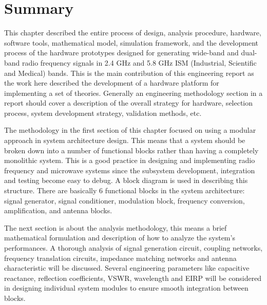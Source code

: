 \documentclass[12pt,a4paper]{report}
\begin{document}
	
	\section{Summary}
	\vspace{0.5\baselineskip}
	
	This chapter described the entire process of design, analysis procedure, hardware, software tools, mathematical model, simulation framework, and the development process of the hardware prototypes designed for generating wide-band and dual-band radio frequency signals in 2.4 GHz and 5.8 GHz ISM (Industrial, Scientific and Medical) bands. This is the main contribution of this engineering report as the work here described the development of a hardware platform for implementing a set of theories. Generally an engineering methodology section in a report should cover a description of the overall strategy for hardware, selection process, system development strategy, validation methods, etc.
	
	\vspace{0.5\baselineskip}
	
	The methodology in the first section of this chapter focused on using a modular approach in system architecture design. This means that a system should be broken down into a number of functional blocks rather than having a completely monolithic system. This is a good practice in designing and implementing radio frequency and microwave systems since the subsystem development, integration and testing become easy to debug. A block diagram is used in describing this structure. There are basically 6 functional blocks in the system architecture: signal generator, signal conditioner, modulation block, frequency conversion, amplification, and antenna blocks.
	
	\vspace{0.5\baselineskip}
	
	The next section is about the analysis methodology, this means a brief mathematical formulation and description of how to analyze the system's performances. A thorough analysis of signal generation circuit, coupling networks, frequency translation circuits, impedance matching networks and antenna characteristic will be discussed. Several engineering parameters like capacitive reactance, reflection coefficients, VSWR, wavelength and EIRP will be considered in designing individual system modules to ensure smooth integration between blocks.
	
	\vspace{0.5\baselineskip}
	
\end{document}
